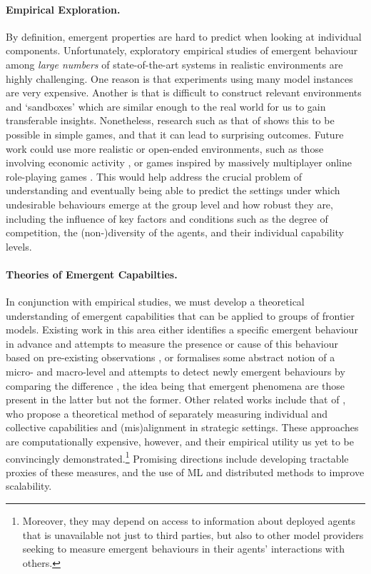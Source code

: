 \paragraph{Empirical Exploration.}
By definition, emergent properties are hard to predict when looking at individual components.
Unfortunately, {exploratory empirical studies} of emergent behaviour among \textit{large numbers} of state-of-the-art systems in realistic environments are highly challenging.
One reason is that experiments using many model instances are very expensive. 
Another is that is difficult to construct relevant environments and `sandboxes' which are similar enough to the real world for us to gain transferable insights.
Nonetheless, research such as that of \citet{park2023generative,Chen2024c, vezhnevets2023generative} shows this to be possible in simple games, and that it can lead to surprising outcomes.
Future work could use more realistic or open-ended environments, such as those involving economic activity \citep{Zheng2022}, or games inspired by massively multiplayer online role-playing games \citep{Suarez2019}.
This would help address the crucial problem of understanding and eventually being able to predict the settings under which undesirable behaviours emerge at the group level and how robust they are, including the influence of key factors and conditions such as the degree of competition, the (non-)diversity of the agents, and their individual capability levels.

\paragraph{Theories of Emergent Capabilties.}
In conjunction with empirical studies, we must develop a {theoretical understanding of emergent capabilities} that can be applied to groups of frontier models.
Existing work in this area either identifies a specific emergent behaviour in advance and attempts to measure the presence or cause of this behaviour based on pre-existing observations \citep{Seth2006,Chen2009}, or formalises some abstract notion of a micro- and macro-level and attempts to detect newly emergent behaviours by comparing the difference \citep{Kubik2003,Teo2013,Szabo2015}, the idea being that emergent phenomena are those present in the latter but not the former.
Other related works include that of \citet{Sourbut2024}, who propose a theoretical method of separately measuring individual and collective capabilities and (mis)alignment in strategic settings.
These approaches are computationally expensive, however, and their empirical utility us yet to be convincingly demonstrated.\footnote{Moreover, they may depend on access to information about deployed agents that is unavailable not just to third parties, but also to other model providers seeking to measure emergent behaviours in their agents' interactions with others.}
Promising directions include developing tractable proxies of these measures, and the use of ML \citep{Dahia2024} and distributed methods \citep{Wang2016a,Otoole2017} to improve scalability.


